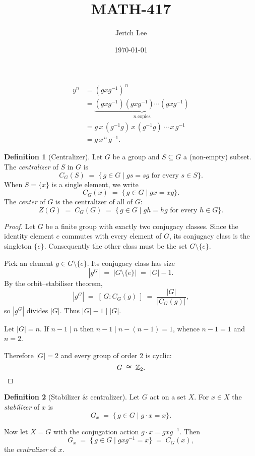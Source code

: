 \documentclass[12pt]{article}
\title{MATH-417}
\author{Jerich Lee}
\date{\today}
\theoremstyle{definition} %
\newtheorem{definition}{Definition}
\theoremstyle{plain} %
\begin{document}
\maketitle
\begin{align}
  y^n 
    &= (g x g^{-1})^{\,n} \\[4pt]
    &= \underbrace{(g x g^{-1})(g x g^{-1})\dotsm(g x g^{-1})}_{n\ \text{copies}} \\[4pt]
    &= g\,x\,(g^{-1}g)\,x\,(g^{-1}g)\,\dotsm\,x\,g^{-1} \\[4pt]
    &= g\,x^{\,n}\,g^{-1}.
  \end{align}
  \begin{definition}[Centralizer]
    Let \(G\) be a group and \(S \subseteq G\) a (non-empty) subset.
    The \emph{centralizer} of \(S\) in \(G\) is
    \[
        C_G(S) \;=\; \{\,g \in G \mid gs = sg \text{ for every } s \in S \}.
    \]
    When \(S = \{x\}\) is a single element, we write
    \[
        C_G(x) \;=\; \{\,g \in G \mid gx = xg \}.
    \]
    The \emph{center} of \(G\) is the centralizer of all of \(G\):
    \[
        Z(G) \;=\; C_G(G) \;=\; \{\,g \in G \mid gh = hg \text{ for every } h \in G \}.
    \]
  \end{definition}
  \begin{proof}
    Let $G$ be a finite group with exactly two conjugacy classes.
    Since the identity element $e$ commutes with every element of $G$, its conjugacy class is the singleton $\{e\}$.
    Consequently the other class must be the set $G\setminus\{e\}$.
    
    Pick an element $g\in G\setminus\{e\}$.
    Its conjugacy class has size
    \[
        |g^G| \;=\; |G\setminus\{e\}| \;=\; |G|-1 .
    \]
    By the orbit–stabiliser theorem,
    \[
        |g^G| \;=\; [\,G:C_G(g)\,] 
        \;=\; \frac{|G|}{|C_G(g)|},
    \]
    so $|g^G|$ divides $|G|$.
    Thus $|G|-1\mid |G|$.
    
    Let $|G| = n$.  
    If $n-1 \mid n$ then $n-1 \mid n-(n-1)=1$, whence $n-1 = 1$ and $n=2$.
    
    Therefore $|G|=2$ and every group of order 2 is cyclic:
    \[
        G \;\cong\; \Bbb Z_2.\qedhere
    \]
    \end{proof}
    \begin{definition}[Stabilizer {\&} centralizer]
      Let $G$ act on a set $X$.  
      For $x\in X$ the \emph{stabilizer} of $x$ is
      \[
          G_x \;=\; \{\,g\in G \mid g\!\cdot\!x = x\}.
      \]
      
      Now let $X=G$ with the conjugation action $g\!\cdot\!x = gxg^{-1}$.
      Then
      \[
          G_x \;=\; \{\,g\in G \mid gxg^{-1}=x\}
                 \;=\; C_G(x),
      \]
      the \emph{centralizer} of $x$.
      \end{definition}
\end{document}
